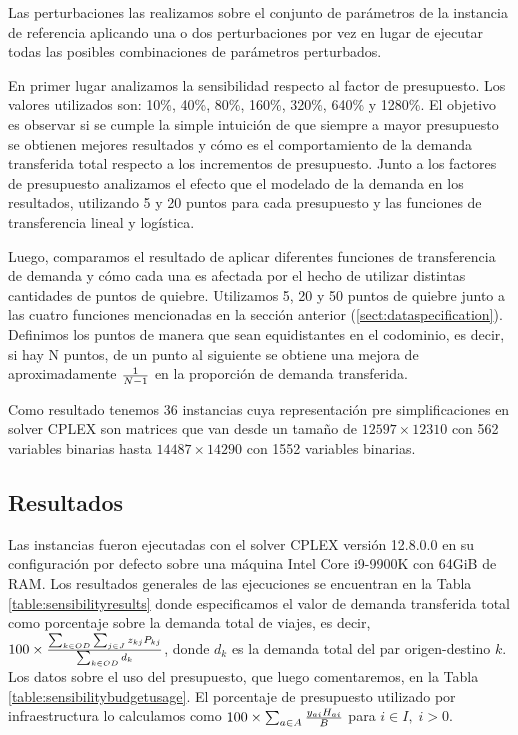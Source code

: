 Las perturbaciones las realizamos sobre el conjunto de parámetros de la instancia de referencia aplicando una o dos perturbaciones por vez en lugar de ejecutar todas las posibles combinaciones de parámetros perturbados.

En primer lugar analizamos la sensibilidad respecto al factor de presupuesto. Los valores utilizados son: 10\%, 40\%, 80\%, 160\%, 320\%, 640\% y 1280\%. El objetivo es observar si se cumple la simple intuición de que siempre a mayor presupuesto se obtienen mejores resultados y cómo es el comportamiento de la demanda transferida total respecto a los incrementos de presupuesto. Junto a los factores de presupuesto analizamos el efecto que el modelado de la demanda en los resultados, utilizando 5 y 20 puntos para cada presupuesto y las funciones de transferencia lineal y logística.

Luego, comparamos el resultado de aplicar diferentes funciones de transferencia de demanda y cómo cada una es afectada por el hecho de utilizar distintas cantidades de puntos de quiebre. Utilizamos 5, 20 y 50 puntos de quiebre junto a las cuatro funciones mencionadas en la sección anterior (\ref{sect:dataspecification}). Definimos los puntos de manera que sean equidistantes en el codominio, es decir, si hay N puntos, de un punto al siguiente se obtiene una mejora de aproximadamente ${1 \over N - 1}$ en la proporción de demanda transferida.

Como resultado tenemos 36 instancias cuya representación pre simplificaciones en solver CPLEX son matrices que van desde un tamaño de $12597 \times 12310$ con 562 variables binarias hasta $14487 \times 14290$ con 1552 variables binarias.

\subsection{Resultados}

Las instancias fueron ejecutadas con el solver CPLEX versión 12.8.0.0 en su configuración por defecto sobre una máquina Intel Core i9-9900K con 64GiB de RAM. Los resultados generales de las ejecuciones se encuentran en la Tabla \ref{table:sensibilityresults} donde especificamos el valor de demanda transferida total como porcentaje sobre la demanda total de viajes, es decir, $100 \times {\sum_{k \in OD} \sum_{j \in J} z_{kj} P_{kj} \over \sum_{k \in OD} d_k}$, donde $d_k$ es la demanda total del par origen-destino $k$. Los datos sobre el uso del presupuesto, que luego comentaremos, en la Tabla \ref{table:sensibilitybudgetusage}. El porcentaje de presupuesto utilizado por infraestructura lo calculamos como $100 \times \sum_{a \in A} {y_{ai} H_{ai} \over B}$ para $i \in I,\; i > 0$.

